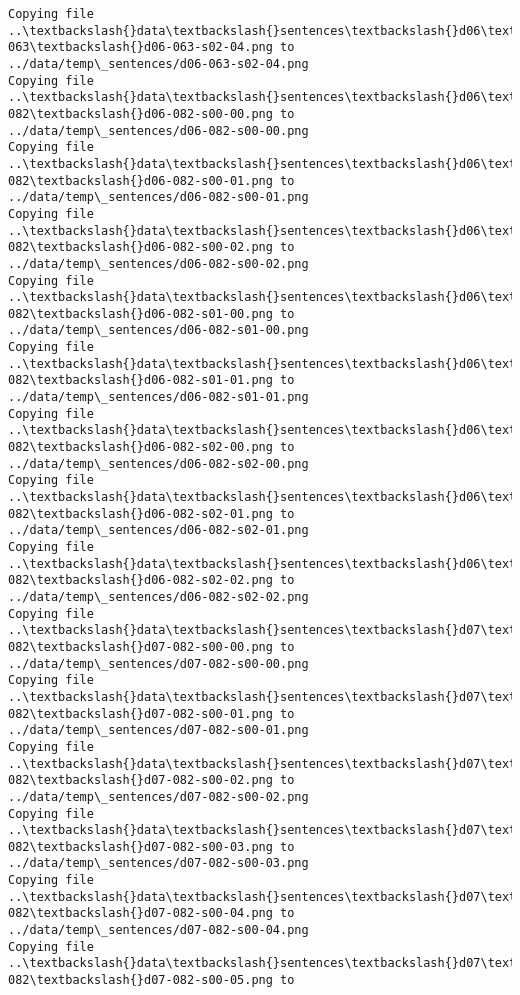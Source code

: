 \documentclass[11pt]{article}
\begin{document}
\begin{Verbatim}[commandchars=\\\{\}]
Copying file ..\textbackslash{}data\textbackslash{}sentences\textbackslash{}d06\textbackslash{}d06-063\textbackslash{}d06-063-s02-04.png to
../data/temp\_sentences/d06-063-s02-04.png
Copying file ..\textbackslash{}data\textbackslash{}sentences\textbackslash{}d06\textbackslash{}d06-082\textbackslash{}d06-082-s00-00.png to
../data/temp\_sentences/d06-082-s00-00.png
Copying file ..\textbackslash{}data\textbackslash{}sentences\textbackslash{}d06\textbackslash{}d06-082\textbackslash{}d06-082-s00-01.png to
../data/temp\_sentences/d06-082-s00-01.png
Copying file ..\textbackslash{}data\textbackslash{}sentences\textbackslash{}d06\textbackslash{}d06-082\textbackslash{}d06-082-s00-02.png to
../data/temp\_sentences/d06-082-s00-02.png
Copying file ..\textbackslash{}data\textbackslash{}sentences\textbackslash{}d06\textbackslash{}d06-082\textbackslash{}d06-082-s01-00.png to
../data/temp\_sentences/d06-082-s01-00.png
Copying file ..\textbackslash{}data\textbackslash{}sentences\textbackslash{}d06\textbackslash{}d06-082\textbackslash{}d06-082-s01-01.png to
../data/temp\_sentences/d06-082-s01-01.png
Copying file ..\textbackslash{}data\textbackslash{}sentences\textbackslash{}d06\textbackslash{}d06-082\textbackslash{}d06-082-s02-00.png to
../data/temp\_sentences/d06-082-s02-00.png
Copying file ..\textbackslash{}data\textbackslash{}sentences\textbackslash{}d06\textbackslash{}d06-082\textbackslash{}d06-082-s02-01.png to
../data/temp\_sentences/d06-082-s02-01.png
Copying file ..\textbackslash{}data\textbackslash{}sentences\textbackslash{}d06\textbackslash{}d06-082\textbackslash{}d06-082-s02-02.png to
../data/temp\_sentences/d06-082-s02-02.png
Copying file ..\textbackslash{}data\textbackslash{}sentences\textbackslash{}d07\textbackslash{}d07-082\textbackslash{}d07-082-s00-00.png to
../data/temp\_sentences/d07-082-s00-00.png
Copying file ..\textbackslash{}data\textbackslash{}sentences\textbackslash{}d07\textbackslash{}d07-082\textbackslash{}d07-082-s00-01.png to
../data/temp\_sentences/d07-082-s00-01.png
Copying file ..\textbackslash{}data\textbackslash{}sentences\textbackslash{}d07\textbackslash{}d07-082\textbackslash{}d07-082-s00-02.png to
../data/temp\_sentences/d07-082-s00-02.png
Copying file ..\textbackslash{}data\textbackslash{}sentences\textbackslash{}d07\textbackslash{}d07-082\textbackslash{}d07-082-s00-03.png to
../data/temp\_sentences/d07-082-s00-03.png
Copying file ..\textbackslash{}data\textbackslash{}sentences\textbackslash{}d07\textbackslash{}d07-082\textbackslash{}d07-082-s00-04.png to
../data/temp\_sentences/d07-082-s00-04.png
Copying file ..\textbackslash{}data\textbackslash{}sentences\textbackslash{}d07\textbackslash{}d07-082\textbackslash{}d07-082-s00-05.png to

\end{Verbatim}
\end{document}
